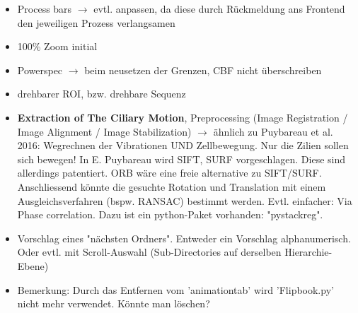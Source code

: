 \documentclass{article}
\begin{document}
\begin{itemize}

\item Process bars $\rightarrow$ evtl. anpassen, da diese durch Rückmeldung ans Frontend 
	den jeweiligen Prozess verlangsamen 
	 
\item 100\% Zoom initial 

\item Powerspec $\rightarrow$ beim neusetzen der Grenzen, CBF nicht überschreiben

\item drehbarer ROI, bzw. drehbare Sequenz 
	 
\item \textbf{Extraction of The Ciliary Motion}, 
Preprocessing (Image Registration / Image Alignment / Image Stabilization) 
$\rightarrow$ ähnlich zu Puybareau et al. 2016: 
Wegrechnen der Vibrationen UND Zellbewegung. Nur die Zilien sollen sich bewegen! 
In E. Puybareau wird SIFT, SURF vorgeschlagen. Diese sind allerdings patentiert. 
ORB wäre eine freie alternative zu SIFT/SURF. Anschliessend könnte die gesuchte 
Rotation und Translation mit einem Ausgleichsverfahren (bspw. RANSAC) bestimmt werden. 
Evtl. einfacher: Via Phase correlation. Dazu ist ein python-Paket vorhanden: "pystackreg". 

\item Vorschlag eines "nächsten Ordners". Entweder ein Vorschlag alphanumerisch. Oder evtl. 
mit Scroll-Auswahl (Sub-Directories auf derselben Hierarchie-Ebene) 

\item Bemerkung: Durch das Entfernen vom 'animationtab' wird 'Flipbook.py' 
nicht mehr verwendet. Könnte man löschen?  




\end{itemize} 
\end{document}
